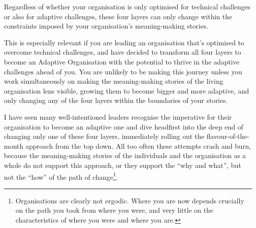 Regardless of whether your organisation is only optimised for technical challenges or also for adaptive challenges, these four layers can only change within the constraints imposed by your organisation’s meaning\hyp{}making stories. 


This is especially relevant if you are leading an organisation that’s optimised to overcome technical challenges, and have decided to transform all four layers to become an Adaptive Organisation  with the potential to thrive in the adaptive challenges ahead of you. You are unlikely to be making this journey unless you work simultaneously on making the meaning\hyp{}making stories of the living organisation lens visible, growing them to become bigger and more adaptive, and only changing any of the four layers within the boundaries of your stories.


I have seen many well-intentioned leaders recognise the imperative for their organisation to become an adaptive one and dive headfirst into the deep end of changing only one of these four layers, immediately rolling out the flavour-of-the-month approach from the top down. All too often these attempts crash and burn, because the meaning\hyp{}making stories of the individuals and the organisation as a whole do not support this approach, or they support the “why and what”, but not the “how” of the path of change\footnote{Organisations are clearly not ergodic.  Where you are now depends crucially on the path you took from where you were, and very little on the characteristics of where you were and where you are.}. 


